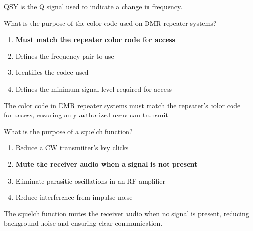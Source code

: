 QSY is the Q signal used to indicate a change in frequency.

\begin{tcolorbox}[colback=gray!10!white,colframe=black!75!black,title={T2B12}]
    What is the purpose of the color code used on DMR repeater systems?
    \begin{enumerate}[label=\Alph*),noitemsep]
        \item \textbf{Must match the repeater color code for access}
        \item Defines the frequency pair to use
        \item Identifies the codec used
        \item Defines the minimum signal level required for access
    \end{enumerate}
\end{tcolorbox}

The color code in DMR repeater systems must match the repeater's color code for access, ensuring only authorized users can transmit.

\begin{tcolorbox}[colback=gray!10!white,colframe=black!75!black,title={T2B13}]
    What is the purpose of a squelch function?
    \begin{enumerate}[label=\Alph*),noitemsep]
        \item Reduce a CW transmitter's key clicks
        \item \textbf{Mute the receiver audio when a signal is not present}
        \item Eliminate parasitic oscillations in an RF amplifier
        \item Reduce interference from impulse noise
    \end{enumerate}
\end{tcolorbox}

The squelch function mutes the receiver audio when no signal is present, reducing background noise and ensuring clear communication.
